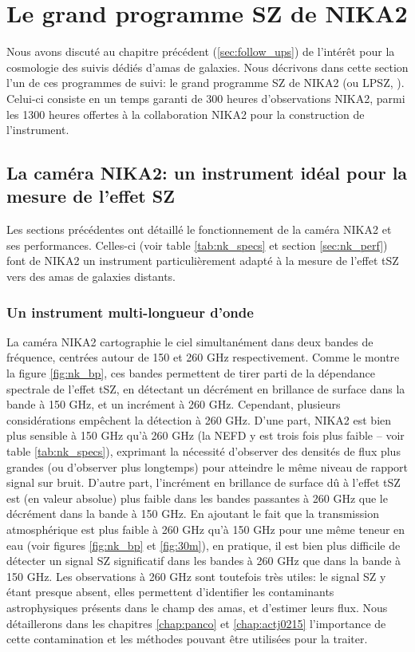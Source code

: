 \section{Le grand programme SZ de NIKA2}\label{sec:lpsz}

Nous avons discuté au chapitre précédent (\ref{sec:follow_ups}) de l'intérêt pour la cosmologie des suivis dédiés d'amas de galaxies.
Nous décrivons dans cette section l'un de ces programmes de suivi: le grand programme SZ de NIKA2 (ou LPSZ, \cite{mayet_cluster_2020}).
Celui-ci consiste en un temps garanti de 300 heures d'observations NIKA2, parmi les 1300 heures offertes à la collaboration NIKA2 pour la construction de l'instrument.

\subsection{La caméra NIKA2: un instrument idéal pour la mesure de l'effet SZ}
\label{sec:nk_sz}

Les sections précédentes ont détaillé le fonctionnement de la caméra NIKA2 et ses performances.
Celles-ci (voir table \ref{tab:nk_specs} et section \ref{sec:nk_perf}) font de NIKA2 un instrument particulièrement adapté à la mesure de l'effet tSZ vers des amas de galaxies distants.

\subsubsection{Un instrument multi-longueur d'onde} %
La caméra NIKA2 cartographie le ciel simultanément dans deux bandes de fréquence, centrées autour de 150 et 260 GHz respectivement.
Comme le montre la figure \ref{fig:nk_bp}, ces bandes permettent de tirer parti de la dépendance spectrale de l'effet tSZ, en détectant un décrément en brillance de surface dans la bande à 150 GHz, et un incrément à 260 GHz.
Cependant, plusieurs considérations empêchent la détection à 260 GHz.
D'une part, NIKA2 est bien plus sensible à 150 GHz qu'à 260 GHz (la NEFD y est trois fois plus faible -- voir table \ref{tab:nk_specs}), exprimant la nécessité d'observer des densités de flux plus grandes (ou d'observer plus longtemps)  pour atteindre le même niveau de rapport signal sur bruit.
D'autre part, l'incrément en brillance de surface dû à l'effet tSZ est (en valeur absolue) plus faible dans les bandes passantes à 260 GHz que le décrément dans la bande à 150 GHz.
En ajoutant le fait que la transmission atmosphérique est plus faible à 260 GHz qu'à 150 GHz pour une même teneur en eau (voir figures \ref{fig:nk_bp} et \ref{fig:30m}), en pratique, il est bien plus difficile de détecter un signal SZ significatif dans les bandes à 260 GHz que dans la bande à 150 GHz.
Les observations à 260 GHz sont toutefois très utiles: le signal SZ y étant presque absent, elles permettent d'identifier les contaminants astrophysiques présents dans le champ des amas, et d'estimer leurs flux.
Nous détaillerons dans les chapitres \ref{chap:panco} et \ref{chap:actj0215} l'importance de cette contamination et les méthodes pouvant être utilisées pour la traiter.


